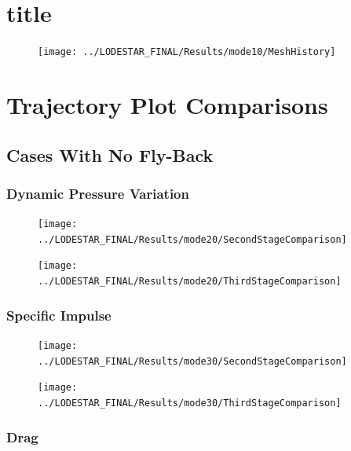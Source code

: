 		\chapter{title}
		
		
\begin{figure}[th]
\centering
\texttt{[image: ../LODESTAR\_FINAL/Results/mode10/MeshHistory]}
\caption{}
\label{fig:MeshHistory}
\end{figure}
		
		\chapter{Trajectory Plot Comparisons}\label{sec:Appendix_trajectorycomparisons}
		
		
		\section{Cases With No Fly-Back}
		
		\subsection{Dynamic Pressure Variation}
		
		
\begin{figure}[!ht]
\centering
\texttt{[image: ../LODESTAR\_FINAL/Results/mode20/SecondStageComparison]}
\caption{}
\label{fig:SecondStageComparison1}
\end{figure}

\begin{figure}[!th]
\centering
\texttt{[image: ../LODESTAR\_FINAL/Results/mode20/ThirdStageComparison]}
\caption{}
\label{fig:ThirdStageComparison1}
\end{figure}
\FloatBarrier
\subsection{Specific Impulse}


\begin{figure}[!th]
\centering
\texttt{[image: ../LODESTAR\_FINAL/Results/mode30/SecondStageComparison]}
\caption{}
\label{fig:SecondStageComparison2}

\end{figure}
\begin{figure}[!th]
\centering
\texttt{[image: ../LODESTAR\_FINAL/Results/mode30/ThirdStageComparison]}
\caption{}
\label{fig:ThirdStageComparison2}
\end{figure}
\FloatBarrier
\subsection{Drag}

